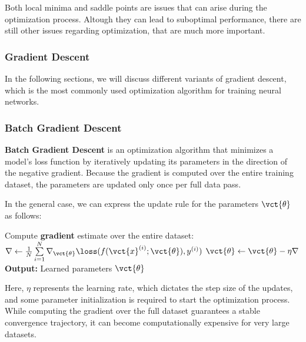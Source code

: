 

Both local minima and saddle points are issues that can arise during the optimization process. Altough they can lead to suboptimal performance,
there are still other issues regarding optimization, that are much more important.

\subsubsection{Gradient Descent}
In the following sections, we will discuss different variants of gradient descent, which is the most commonly used optimization algorithm for training neural networks.

\subsubsection*{Batch Gradient Descent}
\textbf{Batch Gradient Descent} is an optimization algorithm that minimizes a model's loss function by iteratively updating its parameters in the direction of the negative gradient. 
Because the gradient is computed over the entire training dataset, the parameters are updated only once per full data pass.

In the general case, we can express the update rule for the parameters $\vct{\theta}$ as follows:
\begin{algorithm}[H]
    \caption{Batch Gradient Descent}
    \begin{algorithmic}[1]
            \State Compute \textbf{gradient} estimate over the entire dataset:
            \State $\nabla \leftarrow \frac{1}{N} \sum\limits_{i=1}^{N} \nabla_{\vct{\theta}} \loss(f(\vct{x}^{(i)}; \vct{\theta}), y^{(i)})$
            \State $\vct{\theta} \leftarrow \vct{\theta} - \eta \nabla$
        \EndWhile
        \State \textbf{Output:} Learned parameters $\vct{\theta}$
    \end{algorithmic}
\end{algorithm}
Here, $\eta$ represents the learning rate, which dictates the step size of the updates, and some parameter initialization is required to start the optimization process. While computing the gradient over the full dataset guarantees a stable convergence trajectory, it can become computationally expensive for very large datasets.

